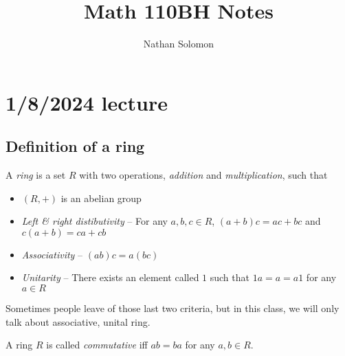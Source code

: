\documentclass[12pt]{article}
\begin{document}
\title{Math 110BH Notes}
\author{Nathan Solomon}
\maketitle

\tableofcontents

\section{1/8/2024 lecture}
\subsection{Definition of a ring}
A \textit{ring} is a set $R$ with two operations, \textit{addition} and \textit{multiplication}, such that
\begin{itemize}
    \item $(R,+)$ is an abelian group
    \item \textit{Left \& right distibutivity} -- For any $a,b,c \in R$, $(a+b)c = ac+bc$ and $c(a+b)=ca+cb$
    \item \textit{Associativity} -- $(ab)c=a(bc)$
    \item \textit{Unitarity} -- There exists an element called $1$ such that $1a=a=a1$ for any $a\in R$
\end{itemize}
Sometimes people leave of those last two criteria, but in this class, we will only talk about associative, unital ring.
\par
A ring $R$ is called \textit{commutative} iff $ab=ba$ for any $a,b \in R$.
\par
\end{document}
